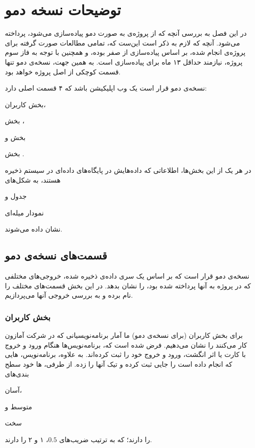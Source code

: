 \chapter{توضیحات نسخه دمو}
در این فصل به بررسی آنچه که از پروژه‌ی 
به صورت دمو پیاده‌سازی می‌شود، پرداخته می‌شود. آنچه که لازم به ذکر است این‌ست که، تمامی مطالعات صورت گرفته برای پروژه‌ی
انجام شده، بر اساس پیاده‌سازی از صفر بوده، و همچنین با توجه به فاز سوم پروژه، نیازمند حداقل ۱۳ ماه برای پیاده‌سازی است. به همین جهت، نسخه‌ی دمو تنها قسمت کوچکی از اصل پروژه خواهد بود.

نسخه‌ی دمو قرار است یک وب اپلیکیشن باشد که ۴ قسمت اصلی دارد: 
\begin{enumerate*}
\item 
بخش کاربران،
\item 
بخش 
،
\item 
بخش 
و
\item
بخش 
. 
\end{enumerate*}
در هر یک از این بخش‌ها، اطلاعاتی که داده‌هایش در پایگاه‌های داده‌ای در سیستم ذخیره‌ هستند، به شکل‌های 
\begin{enumerate*}
\item 
جدول و
\item 
نمودار میله‌ای
\end{enumerate*}
نشان داده می‌شوند.
\section{قسمت‌های نسخه‌ی دمو}
نسخه‌ی دمو قرار است که بر اساس یک سری داده‌ی ذخیره شده، خروجی‌های مختلفی که در پروژه به آنها پرداخته شده بود، را نشان بدهد. در این بخش قسمت‌های مختلف را نام برده و به بررسی خروجی آنها می‌پردازیم.

\subsection{بخش کاربران}\label{ssec:users}
برای بخش کاربران (برای نسخه‌ی دمو) ما آمار برنامه‌نویسیانی که در شرکت آمازون کار می‌کنند را نشان می‌دهیم. فرض شده‌ است که، برنامه‌نویس‌ها هنگام ورود و خروج با کارت یا اثر انگشت، ورود و خروج خود را ثبت کرده‌اند. به علاوه، برنامه‌نویس، هایی که انجام داده‌ است را جایی ثبت کرده و تیک آنها را زده. از طرفی، ها خود سطح بندی‌های 
\begin{enumerate*}
\item 
آسان،
\item 
متوسط و
\item
سخت
\end{enumerate*}
را دارند؛ که به ترتیب ضریب‌‌های $0.5$، ۱ و ۲ را دارند.

